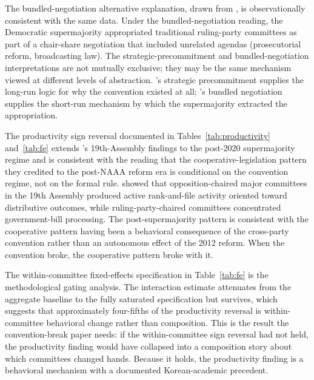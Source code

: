 \documentclass[11pt]{article}
\begin{document}
The bundled-negotiation alternative explanation, drawn from \citet{leekim2022}, is observationally consistent with the same data. Under the bundled-negotiation reading, the Democratic supermajority appropriated traditional ruling-party committees as part of a chair-share negotiation that included unrelated agendas (prosecutorial reform, broadcasting law). The strategic-precommitment and bundled-negotiation interpretations are not mutually exclusive; they may be the same mechanism viewed at different levels of abstraction. \citet{jeong2023}'s strategic precommitment supplies the long-run logic for why the convention existed at all; \citet{leekim2022}'s bundled negotiation supplies the short-run mechanism by which the supermajority extracted the appropriation.

The productivity sign reversal documented in Tables~\ref{tab:productivity} and~\ref{tab:fe} extends \citet{yunan2018}'s 19th-Assembly findings to the post-2020 supermajority regime and is consistent with the reading that the cooperative-legislation pattern they credited to the post-NAAA reform era is conditional on the convention regime, not on the formal rule. \citet{yunan2018} showed that opposition-chaired major committees in the 19th Assembly produced active rank-and-file activity oriented toward distributive outcomes, while ruling-party-chaired committees concentrated government-bill processing. The post-supermajority pattern is consistent with the cooperative pattern having been a behavioral consequence of the cross-party convention rather than an autonomous effect of the 2012 reform. When the convention broke, the cooperative pattern broke with it.

The within-committee fixed-effects specification in Table~\ref{tab:fe} is the methodological gating analysis. The interaction estimate attenuates from the aggregate baseline to the fully saturated specification but survives, which suggests that approximately four-fifths of the productivity reversal is within-committee behavioral change rather than composition. This is the result the convention-break paper needs: if the within-committee sign reversal had not held, the productivity finding would have collapsed into a composition story about which committees changed hands. Because it holds, the productivity finding is a behavioral mechanism with a documented Korean-academic precedent.
\end{document}
